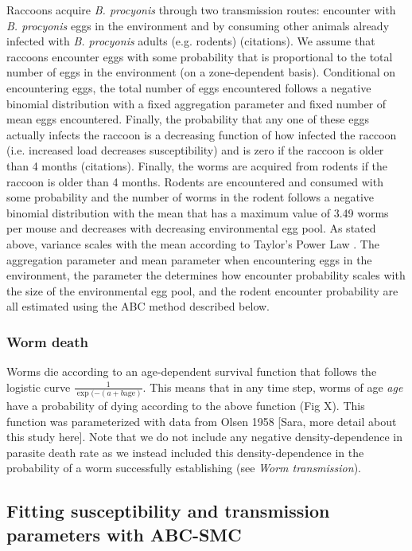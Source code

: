 \documentclass[11pt]{article}
\begin{document}
Raccoons acquire \emph{B. procyonis} through two transmission routes:
encounter with \emph{B. procyonis} eggs in the environment and by
consuming other animals already infected with \emph{B. procyonis} adults
(e.g. rodents) (citations).  We assume that raccoons encounter eggs with some probability that is proportional to the total number of eggs in the environment (on a zone-dependent basis). Conditional on encountering eggs, the total number of eggs encountered follows a negative binomial distribution with a fixed aggregation parameter and fixed number of mean eggs encountered.  Finally, the probability that any one of these eggs actually infects the raccoon is a decreasing function of how infected the raccoon (i.e. increased load decreases susceptibility) and is zero if the raccoon is older than 4 months (citations). Finally, the worms are acquired from rodents if the raccoon is older than 4 months.  Rodents are encountered and consumed with some probability and the number of worms in the rodent follows a negative binomial distribution with the mean that has a maximum value of 3.49 worms per mouse and decreases with decreasing environmental egg pool. As stated above, variance scales with the mean according to Taylor's Power Law \citep{Shaw1995}.  The aggregation parameter and mean parameter when encountering eggs in the environment, the parameter the determines how encounter probability scales with the size of the environmental egg pool, and the rodent encounter probability are all estimated using the ABC method described below.

\subsubsection{Worm death}

Worms die according to an age-dependent survival function that follows the logistic curve $\frac{1}{\exp(-(a + b \text{age})}$.  This means that in any time step, worms of age \emph{age} have a probability of dying according to the above function (Fig X).  This function was parameterized with data from Olsen 1958 [Sara, more detail about this study here].  Note that we do not include any negative density-dependence in parasite death rate as we instead included this density-dependence in the probability of a worm successfully establishing (see \emph{Worm transmission}).

\subsection{Fitting susceptibility and transmission parameters with ABC-SMC}
\end{document}
